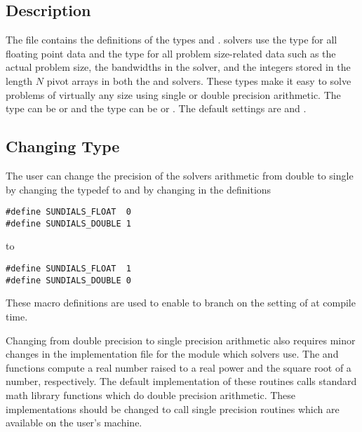 %
\subsection{Description}

The  file contains the definitions of the types  and
. {\sundials} solvers use the type  for all floating point data and
the type  for all problem size-related data such as the actual
problem size, the bandwidths in the {\band} solver, and the integers
stored in the length $N$ pivot arrays in both the {\dense} and {\band} solvers.
These types make it easy to solve problems of virtually any size
using single or double precision arithmetic. The type  can be
 or  and the type  can be  or
. The default settings are  and .

\subsection{Changing Type }

The user can change the precision of the {\sundials} solvers arithmetic from double to single
by changing the typedef  to 
and by changing in  the definitions
\begin{verbatim}
#define SUNDIALS_FLOAT  0
#define SUNDIALS_DOUBLE 1
\end{verbatim}
to
\begin{verbatim}
#define SUNDIALS_FLOAT  1
#define SUNDIALS_DOUBLE 0
\end{verbatim}
These macro definitions are used to enable  to branch on
the setting of  at compile time. 

Changing from double precision to single precision arithmetic also
requires minor changes in the implementation file  for
the {\sundialsmath} module which {\sundials} solvers use. The  and
 functions compute a real number raised to a real power and the
square root of a number, respectively. The default implementation of
these routines calls standard {\C} math library functions which do double
precision arithmetic. These implementations should be changed to call
single precision routines which are available on the user's machine.

